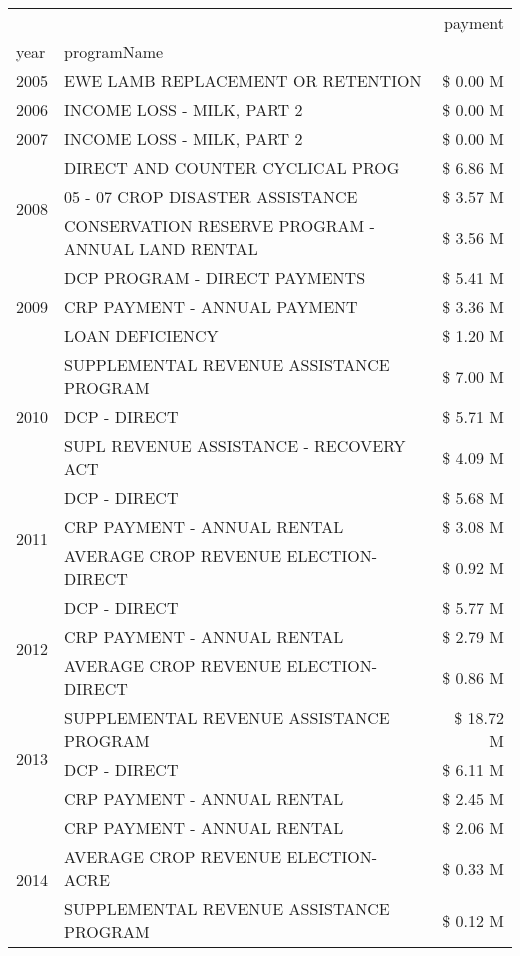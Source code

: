 \begin{tabular}{llr}
\toprule
 &  & payment \\
year & programName &  \\
\midrule
2005 & EWE LAMB REPLACEMENT OR RETENTION & \$ 0.00 M \\
\cline{1-3}
2006 & INCOME LOSS - MILK, PART 2 & \$ 0.00 M \\
\cline{1-3}
2007 & INCOME LOSS - MILK, PART 2 & \$ 0.00 M \\
\cline{1-3}
\multirow[t]{3}{*}{2008} & DIRECT AND COUNTER CYCLICAL PROG & \$ 6.86 M \\
 & 05 - 07 CROP DISASTER ASSISTANCE & \$ 3.57 M \\
 & CONSERVATION RESERVE PROGRAM - ANNUAL LAND RENTAL & \$ 3.56 M \\
\cline{1-3}
\multirow[t]{3}{*}{2009} & DCP PROGRAM - DIRECT PAYMENTS & \$ 5.41 M \\
 & CRP PAYMENT - ANNUAL PAYMENT & \$ 3.36 M \\
 & LOAN DEFICIENCY & \$ 1.20 M \\
\cline{1-3}
\multirow[t]{3}{*}{2010} & SUPPLEMENTAL REVENUE ASSISTANCE PROGRAM & \$ 7.00 M \\
 & DCP - DIRECT & \$ 5.71 M \\
 & SUPL REVENUE ASSISTANCE - RECOVERY ACT & \$ 4.09 M \\
\cline{1-3}
\multirow[t]{3}{*}{2011} & DCP - DIRECT & \$ 5.68 M \\
 & CRP PAYMENT - ANNUAL RENTAL & \$ 3.08 M \\
 & AVERAGE CROP REVENUE ELECTION-DIRECT & \$ 0.92 M \\
\cline{1-3}
\multirow[t]{3}{*}{2012} & DCP - DIRECT & \$ 5.77 M \\
 & CRP PAYMENT - ANNUAL RENTAL & \$ 2.79 M \\
 & AVERAGE CROP REVENUE ELECTION-DIRECT & \$ 0.86 M \\
\cline{1-3}
\multirow[t]{3}{*}{2013} & SUPPLEMENTAL REVENUE ASSISTANCE PROGRAM & \$ 18.72 M \\
 & DCP - DIRECT & \$ 6.11 M \\
 & CRP PAYMENT - ANNUAL RENTAL & \$ 2.45 M \\
\cline{1-3}
\multirow[t]{3}{*}{2014} & CRP PAYMENT - ANNUAL RENTAL & \$ 2.06 M \\
 & AVERAGE CROP REVENUE ELECTION-ACRE & \$ 0.33 M \\
 & SUPPLEMENTAL REVENUE ASSISTANCE PROGRAM & \$ 0.12 M \\
\cline{1-3}

\end{tabular}
